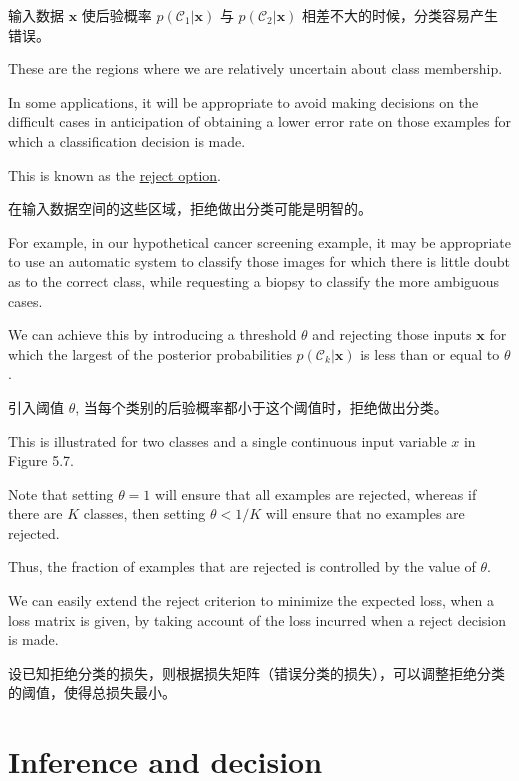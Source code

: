\documentclass{article}
\begin{document}
{\color{red}
输入数据 $\mathbf{x}$ 使后验概率 $p(\mathcal{C}_{1}|\mathbf{x})$ 与 $p(\mathcal{C}_{2}|\mathbf{x})$ 相差不大的时候，分类容易产生错误。
}

These are the regions where we are relatively uncertain about class membership. 

In some applications, it will be appropriate to avoid making decisions on the difficult cases in anticipation of obtaining a lower error rate on those examples for which a classification decision is made. 

This is known as the \underline{\color{red}reject option}. 

{\color{red}
在输入数据空间的这些区域，拒绝做出分类可能是明智的。
}

For example, in our hypothetical cancer screening example, it may be appropriate to use an automatic system to classify those images for which there is little doubt as to the correct class, while requesting a biopsy to classify the more ambiguous cases. 

We can achieve this by introducing a threshold $\theta$ and rejecting those inputs $\mathbf{x}$ for which the largest of the posterior probabilities $p(\mathcal{C}_{k}|\mathbf{x})$ is less than or equal to $\theta$. 

{\color{red}
引入阈值 $\theta$, 当每个类别的后验概率都小于这个阈值时，拒绝做出分类。
}

This is illustrated for two classes and a single continuous input variable $x$ in Figure 5.7. 

Note that setting $\theta=1$ will ensure that all examples are rejected, whereas if there are $K$ classes, then setting $\theta<1/K$ will ensure that no examples are rejected. 

Thus, the fraction of examples that are rejected is controlled by the value of $\theta$.

We can easily extend the reject criterion to minimize the expected loss, when a loss matrix is given, by taking account of the loss incurred when a reject decision is made.

{\color{red}
设已知拒绝分类的损失，则根据损失矩阵（错误分类的损失），可以调整拒绝分类的阈值，使得总损失最小。
}

\section{Inference and decision}
\end{document}
